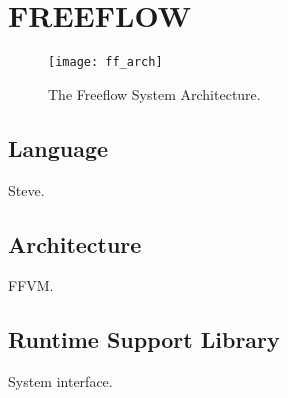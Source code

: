 \chapter{FREEFLOW}
\label{ff}

\begin{figure}[h]
\centering
\texttt{[image: ff\_arch]}
\caption{The Freeflow System Architecture.}
\label{fig:ff_arch}
\end{figure}

\section{Language}
\label{ff:lang}
Steve.

\section{Architecture}
\label{ff:arch}
FFVM.

\section{Runtime Support Library}
\label{ff:runtime}
System interface.
